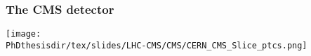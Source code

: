 \begin{frame}
\frametitle{The CMS detector}
\begin{center}
\texttt{[image: \\PhDthesisdir/tex/slides/LHC-CMS/CMS/CERN\_CMS\_Slice\_ptcs.png]}
\end{center}
\end{frame}
